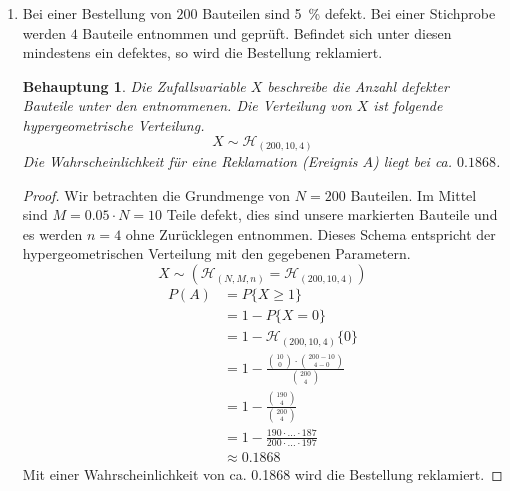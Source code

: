 \documentclass[a4paper]{scrartcl}
\newtheorem*{behaupt}{Behauptung}
\begin{document}
\begin{enumerate}[label=\bfseries\arabic*.]
    \item
        Bei einer Bestellung von $200$ Bauteilen sind \SI{5}{\percent} defekt.
        Bei einer Stichprobe werden $4$ Bauteile entnommen und geprüft.
        Befindet sich unter diesen mindestens ein defektes, so wird die
        Bestellung reklamiert.

    	\begin{behaupt}
            Die Zufallsvariable $X$ beschreibe die Anzahl defekter Bauteile
            unter den entnommenen.
            Die Verteilung von $X$ ist folgende hypergeometrische Verteilung.
            \begin{equation*}
                X \sim \mathcal{H}_{(200, 10, 4)}
            \end{equation*}
            Die Wahrscheinlichkeit für eine Reklamation (Ereignis $A$) liegt bei
            ca. $\num{0,1868}$.
    	\end{behaupt}
        \begin{proof}
            Wir betrachten die Grundmenge von $N = 200$ Bauteilen.
            Im Mittel sind $M = \num{0.05} \cdot N = 10$ Teile defekt, dies sind
            unsere markierten Bauteile und es werden $n = 4$ ohne Zurücklegen
            entnommen.
            Dieses Schema entspricht der hypergeometrischen Verteilung mit
            den gegebenen Parametern.
            \begin{equation*}
                X \sim (\mathcal{H}_{(N, M, n)} = \mathcal{H}_{(200, 10, 4)})
            \end{equation*}
            \begin{equation*}
                \begin{split}
                    P(A) &= P\{X \geq 1\} \\
                    &= 1 - P\{X = 0\} \\
                    &= 1 - \mathcal{H}_{(200, 10, 4)}\{0\} \\
                    &= 1 - \frac{\binom{10}{0} \cdot \binom{200 - 10}{4 - 0}}
                                {\binom{200}{4}} \\
                    &= 1 - \frac{\binom{190}{4}}{\binom{200}{4}} \\
                    &= 1 - \frac{190 \cdot \ldots \cdot 187}
                                {200 \cdot \ldots \cdot 197} \\
                    &\approx \num{0.1868}
                \end{split}
            \end{equation*}
            Mit einer Wahrscheinlichkeit von ca. \num{0,1868} wird die
            Bestellung reklamiert. 
        \end{proof}
    	

\end{enumerate}
\end{document}
